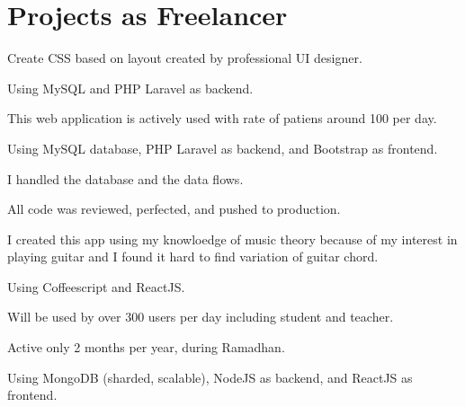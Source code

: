 \documentclass[letterpaper]{deedy-resume} %
\begin{document}
\hfill
\begin{minipage}[t]{0.66\textwidth} %


\section{Projects as Freelancer}

\vspace{\topsep} %
\begin{tightitemize}
\item Create CSS based on layout created by professional UI designer.
\item Using MySQL and PHP Laravel as backend.
\end{tightitemize}
\sectionspace

\begin{tightitemize}
\item This web application is actively used with rate of patiens around 100 per day.
\item Using MySQL database, PHP Laravel as backend, and Bootstrap as frontend.
\item I handled the database and the data flows.
\item All code was reviewed, perfected, and pushed to production.
\end{tightitemize}
\sectionspace

\begin{tightitemize}
\item I created this app using my knowloedge of music theory because of my interest in playing guitar and I found it hard to find variation of guitar chord.
\item Using Coffeescript and ReactJS.
\end{tightitemize}
\sectionspace

\begin{tightitemize}
\item Will be used by over 300 users per day including student and teacher.
\item Active only 2 months per year, during Ramadhan.
\item Using MongoDB (sharded, scalable), NodeJS as backend, and ReactJS as frontend.
\end{tightitemize}
\sectionspace


\end{minipage}
\end{document}
